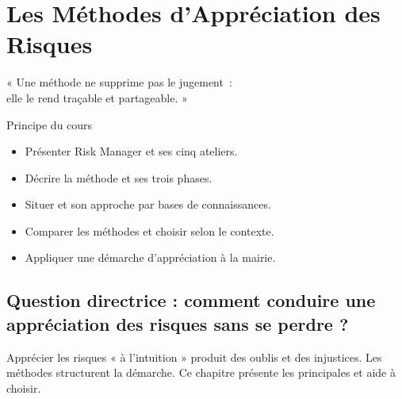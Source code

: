 
\chapter{Les Méthodes d'Appréciation des Risques}
\label{chap:methodes}

\epigraph{%
    « Une méthode ne supprime pas le jugement~:\\
    elle le rend traçable et partageable. »%
}{Principe du cours}


\begin{boxobjectifs}
\begin{itemize}
    \item Présenter  Risk Manager et ses cinq ateliers.
    \item Décrire la méthode  et ses trois phases.
    \item Situer  et son approche par bases de connaissances.
    \item Comparer les méthodes et choisir selon le contexte.
    \item Appliquer une démarche d'appréciation à la mairie.
\end{itemize}
\end{boxobjectifs}

\bigskip

\section*{Question directrice : comment conduire une appréciation des risques sans se perdre ?}

Apprécier les risques « à l'intuition » produit des oublis et des injustices.
Les méthodes structurent la démarche. Ce chapitre présente les principales et
aide à choisir.

